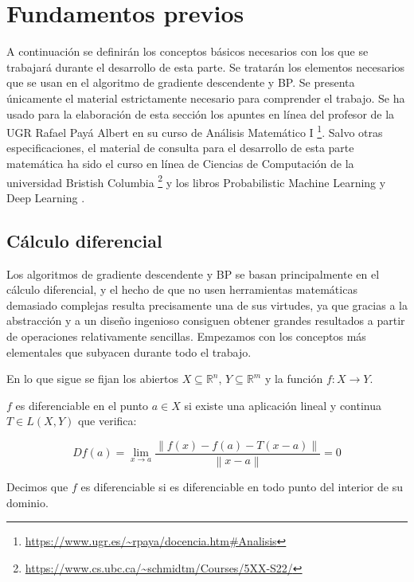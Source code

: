

\section{Fundamentos previos}
A continuación se definirán los conceptos básicos necesarios con los que se trabajará durante el desarrollo de esta parte. Se tratarán los elementos necesarios que se usan en el algoritmo de gradiente descendente y BP. Se presenta únicamente el material estrictamente necesario para comprender el trabajo. Se ha usado para la elaboración de esta sección los apuntes en línea del profesor de la UGR Rafael Payá Albert en su curso de Análisis Matemático I \footnote{\url{https://www.ugr.es/~rpaya/docencia.htm\#Analisis}}.  Salvo otras especificaciones, el material de consulta para el desarrollo de esta parte matemática ha sido el curso en línea de Ciencias de Computación de la universidad Bristish Columbia \footnote{\url{https://www.cs.ubc.ca/~schmidtm/Courses/5XX-S22/}} y los libros Probabilistic Machine Learning \cite{murphy2022probabilistic} y Deep Learning \cite{GoodFellowBook}.


\subsection{Cálculo diferencial}

Los algoritmos de gradiente descendente y BP se basan principalmente en el cálculo diferencial, y el hecho de que no usen herramientas matemáticas demasiado complejas resulta precisamente una de sus virtudes, ya que gracias a la abstracción y a un diseño ingenioso consiguen obtener grandes resultados a partir de operaciones relativamente sencillas. Empezamos con los conceptos más elementales que subyacen durante todo el trabajo.

En lo que sigue se fijan los abiertos $X \subseteq \mathbb{R}^n$, $Y \subseteq \mathbb{R}^m$ y la función $f: X \rightarrow Y$.


\begin{definicion}
    $f$ es diferenciable en el punto $a \in X$ si existe una aplicación lineal y continua $T \in L(X,Y)$ que verifica:

    $$Df(a) = \displaystyle \lim_{x \to a} \frac{\left\| f(x)-f(a)-T(x-a)\right\|}{\left\| x-a\right\|}=0$$
    
    Decimos que $f$ es diferenciable si es diferenciable en todo punto del interior de su dominio.
\end{definicion}





